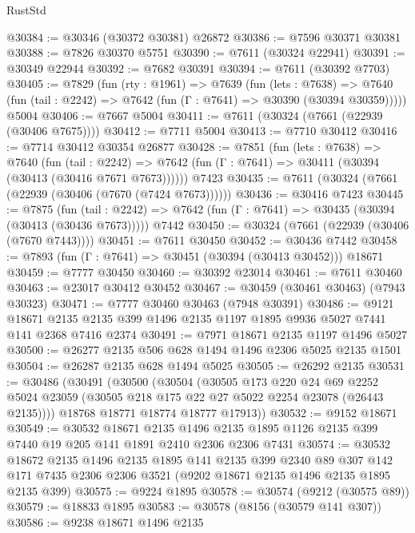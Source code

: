 \begin{lexlean}{RustStd}
\begin{coremodule}
@30384 := @30346 (@30372 @30381) @26872
@30386 := @7596 @30371 @30381
@30388 := @7826 @30370 @5751
@30390 := @7611 (@30324 @22941)
@30391 := @30349 @22944
@30392 := @7682 @30391
@30394 := @7611 (@30392 @7703)
@30405 := @7829
    (fun (rty : @1961) =>
    @7639
      (fun (lets : @7638) =>
      @7640 (fun (tail : @2242) => @7642 (fun (Γ : @7641) => @30390 (@30394 @30359)))))
    @5004
@30406 := @7667 @5004
@30411 := @7611 (@30324 (@7661 (@22939 (@30406 @7675))))
@30412 := @7711 @5004
@30413 := @7710 @30412
@30416 := @7714 @30412 @30354 @26877
@30428 := @7851
    (fun (lets : @7638) =>
    @7640
      (fun (tail : @2242) =>
      @7642 (fun (Γ : @7641) => @30411 (@30394 (@30413 (@30416 @7671 @7673))))))
    @7423
@30435 := @7611 (@30324 (@7661 (@22939 (@30406 (@7670 (@7424 @7673))))))
@30436 := @30416 @7423
@30445 := @7875
    (fun (tail : @2242) => @7642 (fun (Γ : @7641) => @30435 (@30394 (@30413 (@30436 @7673)))))
    @7442
@30450 := @30324 (@7661 (@22939 (@30406 (@7670 @7443))))
@30451 := @7611 @30450
@30452 := @30436 @7442
@30458 := @7893 (fun (Γ : @7641) => @30451 (@30394 (@30413 @30452))) @18671
@30459 := @7777 @30450
@30460 := @30392 @23014
@30461 := @7611 @30460
@30463 := @23017 @30412 @30452
@30467 := @30459 (@30461 @30463) (@7943 @30323)
@30471 := @7777 @30460 @30463 (@7948 @30391)
@30486 := @9121
    @18671
    @2135
    @2135
    @399
    @1496
    @2135
    @1197
    @1895
    @9936
    @5027
    @7441
    @141
    @2368
    @7416
    @2374
@30491 := @7971 @18671 @2135 @1197 @1496 @5027
@30500 := @26277 @2135 @506 @628 @1494 @1496 @2306 @5025 @2135 @1501
@30504 := @26287 @2135 @628 @1494 @5025
@30505 := @26292 @2135
@30531 := @30486
    (@30491
      (@30500
        (@30504
          (@30505
            @173
            @220
            @24
            @69
            @2252
            @5024
            @23059
            (@30505 @218 @175 @22 @27 @5022 @2254 @23078 (@26443 @2135))))
        @18768
        @18771
        @18774
        @18777
        @17913))
@30532 := @9152 @18671
@30549 := @30532
    @18671
    @2135
    @1496
    @2135
    @1895
    @1126
    @2135
    @399
    @7440
    @19
    @205
    @141
    @1891
    @2410
    @2306
    @2306
    @7431
@30574 := @30532
    @18672
    @2135
    @1496
    @2135
    @1895
    @141
    @2135
    @399
    @2340
    @89
    @307
    @142
    @171
    @7435
    @2306
    @2306
    @3521
    (@9202 @18671 @2135 @1496 @2135 @1895 @2135 @399)
@30575 := @9224 @1895
@30578 := @30574 (@9212 (@30575 @89))
@30579 := @18833 @1895
@30583 := @30578 (@8156 (@30579 @141 @307))
@30586 := @9238 @18671 @1496 @2135

\end{coremodule}
\end{lexlean}
